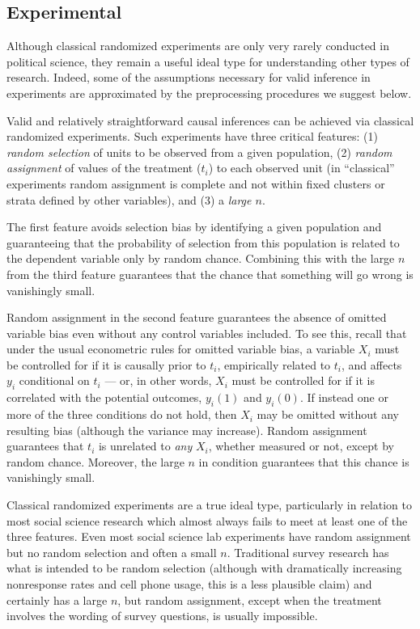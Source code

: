 \documentclass[11pt,titlepage]{article}
\begin{document}
\subsection{Experimental}

Although classical randomized experiments are only very rarely
conducted in political science, they remain a useful ideal type for
understanding other types of research.  Indeed, some of the
assumptions necessary for valid inference in experiments are
approximated by the preprocessing procedures we suggest below.

Valid and relatively straightforward causal inferences can be achieved
via classical randomized experiments.  Such experiments have three
critical features: (1) \emph{random selection} of units to be observed
from a given population, (2) \emph{random assignment} of values of the
treatment ($t_i$) to each observed unit (in ``classical'' experiments
random assignment is complete and not within fixed clusters or strata
defined by other variables), and (3) a \emph{large $n$}.

The first feature avoids selection bias by identifying a given
population and guaranteeing that the probability of selection from
this population is related to the dependent variable only by random
chance.  Combining this with the large $n$ from the third feature
guarantees that the chance that something will go wrong is vanishingly
small.

Random assignment in the second feature guarantees the absence of
omitted variable bias even without any control variables included.  To
see this, recall that under the usual econometric rules for omitted
variable bias, a variable $X_i$ must be controlled for if it is
causally prior to $t_i$, empirically related to $t_i$, and affects
$y_i$ conditional on $t_i$ --- or, in other words, $X_i$ must be
controlled for if it is correlated with the potential outcomes,
$y_i(1)$ and $y_i(0)$.  If instead one or more of the three conditions
do not hold, then $X_i$ may be omitted without any resulting bias
(although the variance may increase).  Random assignment guarantees
that $t_i$ is unrelated to \emph{any} $X_i$, whether measured or not,
except by random chance.  Moreover, the large $n$ in condition
guarantees that this chance is vanishingly small.

Classical randomized experiments are a true ideal type, particularly
in relation to most social science research which almost always fails
to meet at least one of the three features.  Even most social science
lab experiments have random assignment but no random selection and
often a small $n$.  Traditional survey research has what is intended
to be random selection (although with dramatically increasing
nonresponse rates and cell phone usage, this is a less plausible
claim) and certainly has a large $n$, but random assignment, except
when the treatment involves the wording of survey questions, is
usually impossible.
\end{document}
